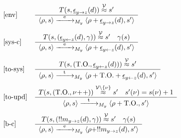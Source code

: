 \documentclass{sig-alternate}
\newcommand{\e}{\epsilon}
\newcommand{\condition}{\gamma}
\newcommand{\V}{\mathcal{V}}
\newcommand{\timeout}{\mathrm{T.O.}}
\newcommand{\locev}[1]{\underline{#1}}
\newcommand{\vareq}[1]{\overset{#1}{\approx}}
\newcommand{\env}[4]{\locev{#1}_{{#2} \rightarrow {#3}}(#4)}
\newcommand{\sys}[4]{\locev{#1}_{{#2} \leftarrow {#3}}(#4)}
\begin{document}
\begin{table}
\centering
\begin{equation*}
\hspace{-0.3cm}\begin{array}{ll}

\text{[env]} &
\frac{
\begin{array}{c}
T(s, \env{\e}{y}{z}{d}) \vareq{\V} s'
\end{array}}{
\begin{array}{c}
\langle \rho, s \rangle \smallstep{\mathrm{e}}{y} \langle \rho + \env{\e}{y}{z}{d}, s' \rangle
\end{array}} \\[\lsp]

\text{[sys-c]} &
\frac{
\begin{array}{cc}
T(s, (\sys{\e}{y}{z}{d}, \condition)) \vareq{\V} s' & \condition(s)
\end{array}}{
\begin{array}{c}
\langle \rho, s \rangle \smallstep{\mathrm{e}}{y} \langle \rho + \sys{\e}{y}{z}{d}, s' \rangle
\end{array}} \\[\lsp]

\text{[to-sys]} &
\frac{
\begin{array}{c}
T(s, (\timeout, \sys{\e}{y}{z}{d})) \vareq{\V} s'
\end{array}}{
\begin{array}{c}
\langle \rho, s \rangle \smallstep{\mathrm{t}}{y} \langle \rho + \timeout + \sys{\e}{y}{z}{d}, s' \rangle
\end{array}} \\[\lsp]

\text{[to-upd]} &
\frac{
\begin{array}{cc}
T(s, (\timeout, \nu\!+\!+)) \vareq{\V \backslash \{\nu\}} s' & s'(\nu) = s(\nu) + 1
\end{array}}{
\begin{array}{c}
\langle \rho, s \rangle \smallstep{\mathrm{t}}{y} \langle \rho + \timeout, s' \rangle
\end{array}} \\[\lsp]

\text{[b-c]} &
\frac{
\begin{array}{cc}
T(s, (!!m_{y \rightarrow z}(d), \condition)) \vareq{\V} s' & \condition(s)
\end{array}}{
\begin{array}{c}
\langle \rho, s \rangle \smallstep{\mathrm{e}}{y} \langle \rho + !!m_{y \rightarrow z}(d), s' \rangle
\end{array}} \\[\lsp]


\end{array}
\end{equation*}
\end{table}
\end{document}
